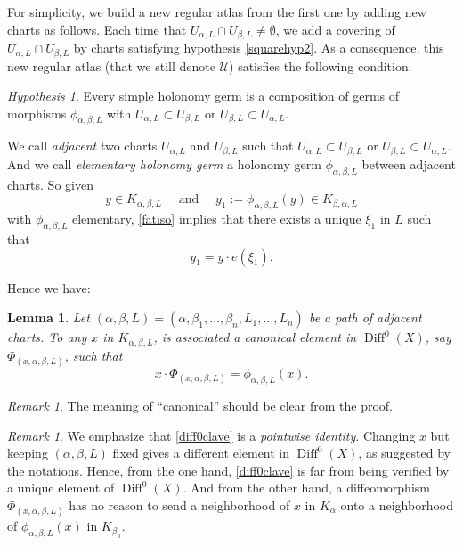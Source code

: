\documentclass[10pt]{amsart}
\let\mathcal\mathscr
\DeclareMathOperator{\Diff}{Diff}
\theoremstyle{plain}
\newtheorem{lemma}[theorem]{Lemma}
\theoremstyle{definition}
\theoremstyle{remark}
\newtheorem{remark}[theorem]{Remark}
\newtheorem{hypothesis}[theorem]{Hypothesis}
\numberwithin{equation}{section}
\begin{document}
For simplicity, we build a new regular atlas from the first one by adding new charts as follows. Each time that $U_{\alpha, L}\cap U_{\beta,L}\not = \emptyset$, we add a covering of $U_{\alpha, L}\cap U_{\beta,L}$ by charts satisfying hypothesis \ref{squarehyp2}. As a consequence, this new regular atlas (that we still denote $\mathcal U$) satisfies the following condition.
\begin{hypothesis}
\label{intercondition}
Every simple holonomy germ is a composition of germs of morphisms $\phi_{\alpha, \beta, L}$ with $U_{\alpha,L}\subset U_{\beta,L}$ or $U_{\beta,L}\subset U_{\alpha,L}$.
\end{hypothesis}
We call \emph{adjacent} two charts $U_{\alpha,L}$ and $U_{\beta,L}$ such that $U_{\alpha,L}\subset U_{\beta,L}$ or $U_{\beta,L}\subset U_{\alpha,L}$. And we call \emph{elementary holonomy germ} a holonomy germ $\phi_{\alpha, \beta, L}$ between adjacent charts. So given
\begin{equation}
\label{ic2}
y\in K_{\alpha,\beta,L}\quad\text{ and }\quad y_1:=\phi_{\alpha,\beta, L}(y)\in K_{\beta, \alpha, L}
\end{equation}
with $\phi_{\alpha, \beta, L}$ elementary, \eqref{fatiso} implies that there exists a unique $\xi_1$ in $L$ such that
\begin{equation}
\label{ic3}
y_1=y\cdot e(\xi_1).
\end{equation}

\pagebreak[2]
Hence we have:
\begin{lemma}
\label{diff0encoding}
Let $(\alpha,\beta,L)=(\alpha,\beta_1,\hdots,\beta_n,L_1,\hdots, L_n)$ be a path of adjacent charts.
To any $x$ in $K_{\alpha,\beta, L}$, is associated a canonical element in $\Diff^0(X)$, say $\Phi_{(x,\alpha,\beta, L)}$, such that
\begin{equation}
\label{diff0clave}
x\cdot\Phi_{(x,\alpha,\beta, L)}=\phi_{\alpha,\beta, L}(x).
\end{equation}
\end{lemma}
\begin{remark}
The meaning of ``canonical'' should be clear from the proof.
\end{remark}

\begin{remark}
We emphasize that \eqref{diff0clave} is a \emph{pointwise identity}. Changing $x$ but keeping $(\alpha,\beta,L)$ fixed gives a different element in $\Diff^0(X)$, as suggested by the notations. Hence, from the one hand, \eqref{diff0clave} is far from being verified by a unique element of $\Diff^0(X)$. And from the other hand, a diffeomorphism $\Phi_{(x,\alpha,\beta, L)}$ has no reason to send a neighborhood of $x$ in $K_\alpha$ onto a neighborhood of $\phi_{\alpha,\beta, L}(x)$ in $K_{\beta_n}$.
\end{remark}
\end{document}
